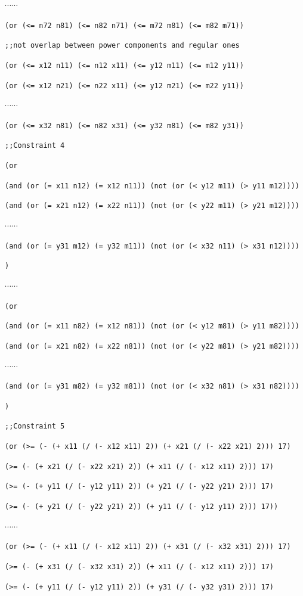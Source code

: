 \documentclass[11pt]{article}
\begin{document}
{{$\cdots \cdots$

{\tt (or (<= n72 n81) (<= n82 n71) (<= m72 m81) (<= m82 m71))}

{\tt ;;not overlap between power components and regular ones}

{\tt (or (<= x12 n11) (<= n12 x11) (<= y12 m11) (<= m12 y11))}

{\tt (or (<= x12 n21) (<= n22 x11) (<= y12 m21) (<= m22 y11))}

$\cdots \cdots$

{\tt (or (<= x32 n81) (<= n82 x31) (<= y32 m81) (<= m82 y31))}

{\tt ;;Constraint 4}

{\tt (or}

{\tt (and (or (= x11 n12) (= x12 n11)) (not (or (< y12 m11) (> y11 m12))))}

{\tt (and (or (= x21 n12) (= x22 n11)) (not (or (< y22 m11) (> y21 m12))))}

$\cdots \cdots$

{\tt (and (or (= y31 m12) (= y32 m11)) (not (or (< x32 n11) (> x31 n12))))}

{\tt )}

$\cdots \cdots$

{\tt (or}

{\tt (and (or (= x11 n82) (= x12 n81)) (not (or (< y12 m81) (> y11 m82))))}

{\tt (and (or (= x21 n82) (= x22 n81)) (not (or (< y22 m81) (> y21 m82))))}

$\cdots \cdots$

{\tt (and (or (= y31 m82) (= y32 m81)) (not (or (< x32 n81) (> x31 n82))))}

{\tt )}

{\tt ;;Constraint 5}

{\tt (or (>= (- (+ x11 (/ (- x12 x11) 2)) (+ x21 (/ (- x22 x21) 2))) 17)}

{\tt (>= (- (+ x21 (/ (- x22 x21) 2)) (+ x11 (/ (- x12 x11) 2))) 17)}

{\tt (>= (- (+ y11 (/ (- y12 y11) 2)) (+ y21 (/ (- y22 y21) 2))) 17)}

{\tt (>= (- (+ y21 (/ (- y22 y21) 2)) (+ y11 (/ (- y12 y11) 2))) 17))}

$\cdots \cdots$

{\tt (or (>= (- (+ x11 (/ (- x12 x11) 2)) (+ x31 (/ (- x32 x31) 2))) 17)}

{\tt (>= (- (+ x31 (/ (- x32 x31) 2)) (+ x11 (/ (- x12 x11) 2))) 17)}

{\tt (>= (- (+ y11 (/ (- y12 y11) 2)) (+ y31 (/ (- y32 y31) 2))) 17)}

}}
\end{document}

